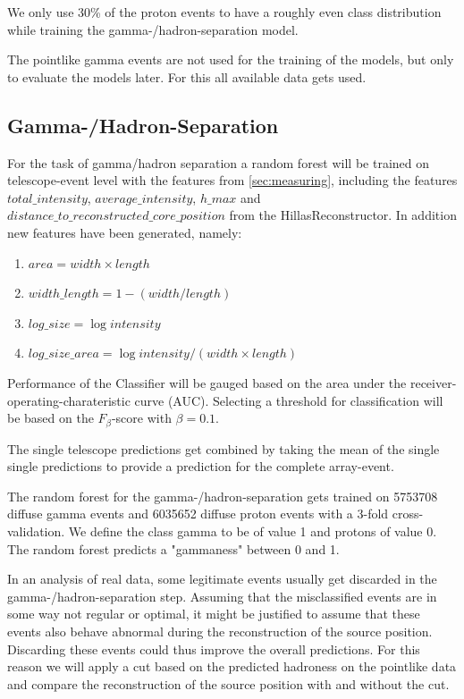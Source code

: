 We only use 30\% of the proton events to have a roughly even class distribution while training 
the gamma-/hadron-separation model.

The pointlike gamma events are not used for the training of the models,
but only to evaluate the models later.
For this all available data gets used.

\subsection{Gamma-/Hadron-Separation}
\label{sec:gh_sep}

For the task of gamma/hadron separation a random forest will be trained
on telescope-event level with the features from \ref{sec:measuring}, including
the features $total\_intensity$, $average\_intensity$, $h\_max$
and $distance\_to\_reconstructed\_core\_position$ from the
HillasReconstructor.
In addition new features have been generated, namely:

\begin{enumerate}
    \item $area = width \times length$
    \item $width\_length = 1 - (width/length)$
    \item $log\_size = \log{intensity}$
    \item $log\_size\_area = \log{intensity} / (width \times length)$
\end{enumerate}

Performance of the Classifier will be gauged based 
on the area under the receiver-operating-charateristic curve (AUC).
Selecting a threshold for classification will be based on
the $F_{\beta}$-score with $\beta = 0.1$.

The single telescope predictions get combined by
taking the mean of the single
single predictions to provide a prediction for the complete
array-event.

The random forest for the gamma-/hadron-separation gets trained on 
\num{5753708} diffuse gamma events and \num{6035652} diffuse proton events with a 3-fold cross-validation.
We define the class gamma to be of value 1 and protons of value 0.
The random forest predicts a "gammaness" between 0 and 1.

In an analysis of real data, some legitimate events usually get discarded
in the gamma-/hadron-separation step.
Assuming that the misclassified events are in some way not regular or optimal, it might be 
justified to assume that these events also behave abnormal during the reconstruction of 
the source position. Discarding these events could thus improve the overall 
predictions.
For this reason we will apply a cut based on the predicted hadroness on the pointlike data
and compare the reconstruction of the source position with and without the cut.


